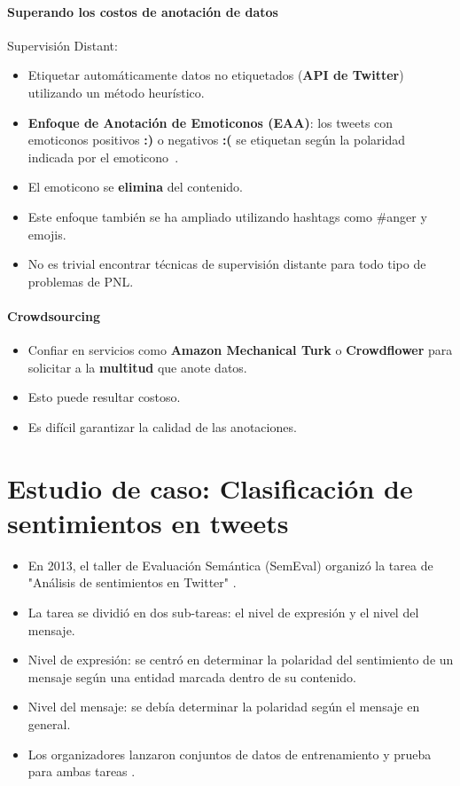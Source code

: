 \documentclass{book}
\begin{document}
\paragraph{Superando los costos de anotación de datos}
Supervisión Distant:
\begin{itemize}
   \item Etiquetar automáticamente datos no etiquetados (\textbf{API de Twitter}) utilizando un método heurístico.
   \item \textbf{Enfoque de Anotación de Emoticonos (EAA)}: los tweets con emoticonos positivos \textcolor[rgb]{0.00,0.00,1.00}{\textbf{:)}} o negativos \textcolor[rgb]{1.00,0.00,0.00}{\textbf{:(}} se etiquetan según la polaridad indicada por el emoticono~\cite{Read2005}.
   \item El emoticono se \textbf{elimina} del contenido.
   \item Este enfoque también se ha ampliado utilizando hashtags como \#anger y emojis.
   \item No es trivial encontrar técnicas de supervisión distante para todo tipo de problemas de PNL.
\end{itemize}

\paragraph{Crowdsourcing}
\begin{itemize}
   \item Confiar en servicios como \textbf{Amazon Mechanical Turk} o \textbf{Crowdflower} para solicitar a la \textbf{multitud} que anote datos.
   \item Esto puede resultar costoso.
   \item Es difícil garantizar la calidad de las anotaciones.
\end{itemize}

\section{Estudio de caso: Clasificación de sentimientos en tweets}

\begin{itemize}
   \item En 2013, el taller de Evaluación Semántica (SemEval) organizó la tarea de "Análisis de sentimientos en Twitter" \cite{Semeval2013}.
   \item La tarea se dividió en dos sub-tareas: el nivel de expresión y el nivel del mensaje.
   \item Nivel de expresión: se centró en determinar la polaridad del sentimiento de un mensaje según una entidad marcada dentro de su contenido.
   \item Nivel del mensaje: se debía determinar la polaridad según el mensaje en general.
   \item Los organizadores lanzaron conjuntos de datos de entrenamiento y prueba para ambas tareas \cite{Semeval2013}.
\end{itemize}
\end{document}
